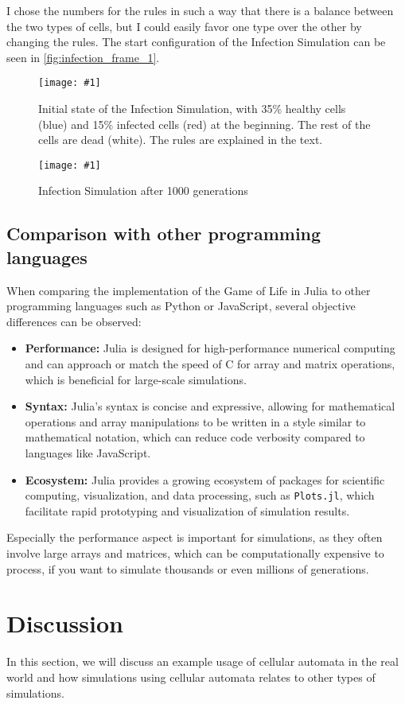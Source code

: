 \documentclass[a4paper,12pt]{llncs}
\numberwithin{equation}{section}
\newcommand{\imagewithwidth}[5]{
  \begin{figure}[htbp]%
    \begin{center}%
      \texttt{[image: \#1]}%
      \caption[#5]{#4}%
      \label{#3}%
    \end{center}%
  \end{figure}
}
\begin{document}
I chose the numbers for the rules in such a way that there is a balance between the two types of cells, but I could easily favor one type over the other by changing the rules.
The start configuration of the Infection Simulation can be seen in \autoref{fig:infection_frame_1}.
\imagewithwidth{figures/infection_frame_1}{0.4\textwidth}{fig:infection_frame_1}{Initial state of the Infection Simulation, with 35\% healthy cells (blue) and 15\% infected cells (red) at the beginning. The rest of the cells are dead (white). The rules are explained in the text.}{}
\imagewithwidth{figures/infection_frame_1000}{0.4\textwidth}{fig:infection_frame_1000}{Infection Simulation after 1000 generations}{}
\subsection{Comparison with other programming languages}
When comparing the implementation of the Game of Life in Julia to other programming languages such as Python or JavaScript, several objective differences can be observed:
\begin{itemize}
  \item \textbf{Performance:} Julia is designed for high-performance numerical computing and can approach or match the speed of C for array and matrix operations, which is beneficial for large-scale simulations.
  \item \textbf{Syntax:} Julia's syntax is concise and expressive, allowing for mathematical operations and array manipulations to be written in a style similar to mathematical notation, which can reduce code verbosity compared to languages like JavaScript.
  \item \textbf{Ecosystem:} Julia provides a growing ecosystem of packages for scientific computing, visualization, and data processing, such as \texttt{Plots.jl}, which facilitate rapid prototyping and visualization of simulation results.
\end{itemize}
Especially the performance aspect is important for simulations, as they often involve large arrays and matrices,
which can be computationally expensive to process, if you want to simulate thousands or even millions of generations.
\section{Discussion}
In this section, we will discuss an example usage of cellular automata in the real world and how simulations using cellular automata relates to other types of simulations.
\end{document}

